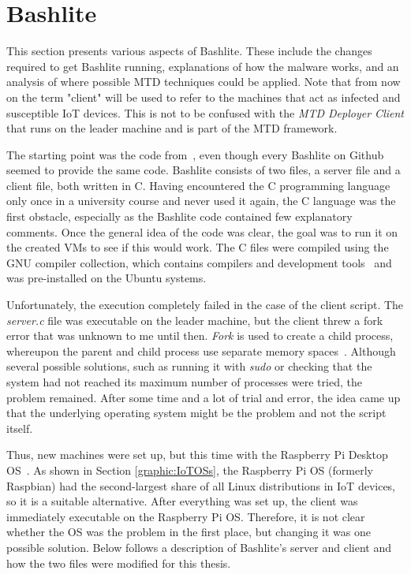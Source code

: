 \section{Bashlite}
This section presents various aspects of Bashlite. These include the changes required to get Bashlite running, explanations of how the malware works, and an analysis of where possible MTD techniques could be applied. Note that from now on the term "client" will be used to refer to the machines that act as infected and susceptible IoT devices. This is not to be confused with the \textit{MTD Deployer Client} that runs on the leader machine and is part of the MTD framework.


The starting point was the code from~\cite{website:githubBashlite}, even though every Bashlite on Github seemed to provide the same code. Bashlite consists of two files, a server file and a client file, both written in C. Having encountered the C programming language only once in a university course and never used it again, the C language was the first obstacle, especially as the Bashlite code contained few explanatory comments. Once the general idea of the code was clear, the goal was to run it on the created VMs to see if this would work. The C files were compiled using the GNU compiler collection, which contains compilers and development tools~\cite{website:gccincredicuild} and was pre-installed on the Ubuntu systems.

Unfortunately, the execution completely failed in the case of the client script. The \textit{server.c} file was executable on the leader machine, but the client threw a fork error that was unknown to me until then. \textit{Fork} is used to create a child process, whereupon the parent and child process use separate memory spaces~\cite{website:fork}. Although several possible solutions, such as running it with \textit{sudo} or checking that the system had not reached its maximum number of processes were tried, the problem remained. After some time and a lot of trial and error, the idea came up that the underlying operating system might be the problem and not the script itself. 

Thus, new machines were set up, but this time with the Raspberry Pi Desktop OS~\cite{website:raspberryOSDesktop}. As shown in Section \ref{graphic:IoTOSs}, the Raspberry Pi OS (formerly Raspbian) had the second-largest share of all Linux distributions in IoT devices, so it is a suitable alternative. After everything was set up, the client was immediately executable on the Raspberry Pi OS. Therefore, it is not clear whether the OS was the problem in the first place, but changing it was one possible solution. Below follows a description of Bashlite's server and client and how the two files were modified for this thesis. 

